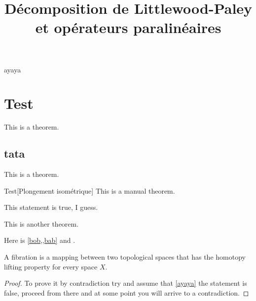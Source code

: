 \documentclass[11pt,a4paper]{article}
\title{\textbf{Décomposition de Littlewood-Paley et opérateurs paralinéaires}}
\date{}
\begin{document}
\maketitle
ayaya
\section{Test}
\begin{theorem}\label{bob}
This is a theorem.
\end{theorem}
\subsection{tata}

\begin{theorem}\label{bab}
This is a theorem.
\end{theorem}

\begin{mth}{Test}[Plongement isométrique]\label{foo}
This is a manual theorem.
\end{mth}

\begin{rmq}
This statement is true, I guess.
\end{rmq}

\begin{theorem}
This is another theorem.
\end{theorem}
Here is \cref{bob,,bab} and .

\begin{defin}[Fibration]\label{ayaya}
A fibration is a mapping between two topological spaces that has the homotopy lifting property for every space \(X\).
\end{defin}

\begin{proof}
To prove it by contradiction try and assume that \cref{ayaya} the statement is false,
proceed from there and at some point you will arrive to a contradiction.
\end{proof}
\end{document}
